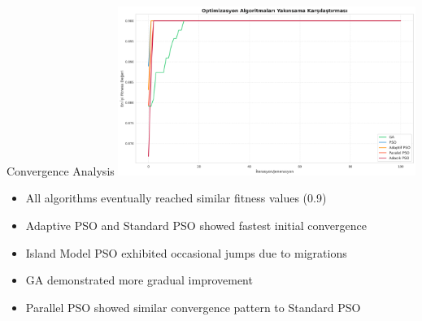 \documentclass[aspectratio=169,xcolor=table]{beamer}
\begin{document}
\begin{frame}{Convergence Analysis}
  \centering
  \includegraphics[width=\textwidth, height=5.5cm, keepaspectratio]{convergence_comparison.png}
  
  \begin{tcolorbox}[
    enhanced,
    colback=blue!5,
    colframe=blue!70,
    arc=2mm,
    title=Observations,
    fonttitle=\bfseries\large,
    boxrule=0.5mm
  ]
    \begin{itemize}
      \item All algorithms eventually reached similar fitness values (0.9)
      \item Adaptive PSO and Standard PSO showed fastest initial convergence
      \item Island Model PSO exhibited occasional jumps due to migrations
      \item GA demonstrated more gradual improvement
      \item Parallel PSO showed similar convergence pattern to Standard PSO
    \end{itemize}
  \end{tcolorbox}
\end{frame}
\end{document}
